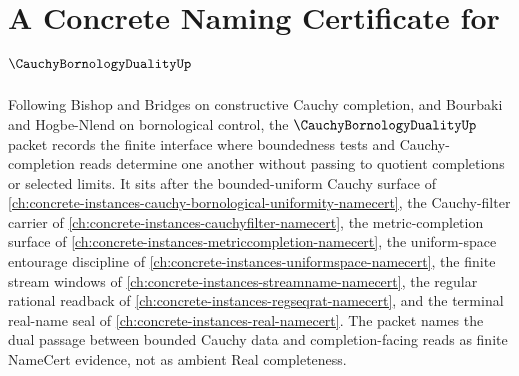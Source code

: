 \chapter{A Concrete Naming Certificate for $\CauchyBornologyDualityUp$}
\label{ch:concrete-instances-cauchy-bornology-duality-namecert}

Following Bishop and Bridges on constructive Cauchy completion, and Bourbaki and Hogbe-Nlend on bornological control, the $\CauchyBornologyDualityUp$ packet records the finite interface where boundedness tests and Cauchy-completion reads determine one another without passing to quotient completions or selected limits. It sits after the bounded-uniform Cauchy surface of \autoref{ch:concrete-instances-cauchy-bornological-uniformity-namecert}, the Cauchy-filter carrier of \autoref{ch:concrete-instances-cauchyfilter-namecert}, the metric-completion surface of \autoref{ch:concrete-instances-metriccompletion-namecert}, the uniform-space entourage discipline of \autoref{ch:concrete-instances-uniformspace-namecert}, the finite stream windows of \autoref{ch:concrete-instances-streamname-namecert}, the regular rational readback of \autoref{ch:concrete-instances-regseqrat-namecert}, and the terminal real-name seal of \autoref{ch:concrete-instances-real-namecert}. The packet names the dual passage between bounded Cauchy data and completion-facing reads as finite NameCert evidence, not as ambient Real completeness.

